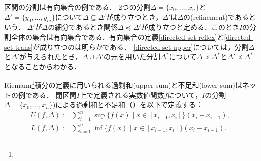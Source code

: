 \documentclass{ltjsbook}
\begin{document}
\begin{exa}
区間の分割は有向集合の例である．
2つの分割\(\Delta = \{x_0, \ldots, x_n\}\)と\(\Delta' = \{y_0, \ldots, y_m\}\)について\(\Delta \subseteq \Delta' \)が成り立つとき，\(\Delta'\)は\(\Delta\)の(refinement)であるという．
\(\Delta'\)が\(\Delta\)の細分であるとき関係\(\Delta \preceq \Delta'\)が成り立つと定める．このとき\(I\)の分割全体の集合は有向集合である．有向集合の定義\ref{directed-set-reflex}と\ref{directed-set-trans}が成り立つのは明らかである．
\ref{directed-set-upper}については，分割\(\Delta\)と\(\Delta'\)が与えられたとき，\(\Delta \cup \Delta'\)の元を用いた分割\(\Delta^*\)について\(\Delta \preceq \Delta^*\)と\(\Delta' \preceq \Delta^*\)となることからわかる．

Riemann\footnote{}積分の定義に用いられる過剰和(upper sum)と不足和(lower sum)はネットの例である．
閉区間\(I\)上で定義される実数値関数\(f\)について，\(I\)の分割\(\Delta = \{x_0, \ldots, x_n\})\)による過剰和と不足和（）を以下で定義する：
\begin{gather}
    U(f, \Delta) := \sum_{i = 1}^n \sup \{ f(x) \mid x \in [x_{i - 1}, x_i] \} (x_i - x_{i - 1}), \\
    L(f, \Delta) := \sum_{i = 1}^n \inf \{ f(x) \mid x \in [x_{i - 1}, x_i] \} (x_i - x_{i - 1}).
\end{gather}
\end{exa}

\end{document}
